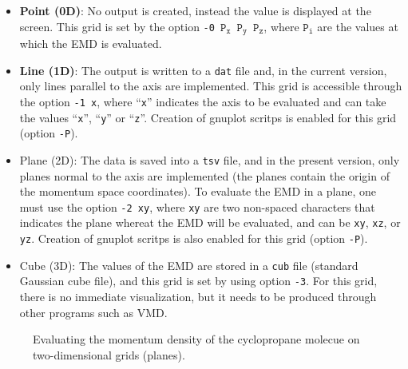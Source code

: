 \begin{itemize}
   \item \textbf{Point (0D)}: No output is created, instead the value is displayed at the screen. This grid is set by the option \texttt{-0 $\mathtt{P}_\mathtt{x}$ $\mathtt{P}_\mathtt{y}$ $\mathtt{P}_\mathtt{z}$}, where \texttt{$\mathtt{P}_\mathtt{i}$} are the values at which the EMD is evaluated.
   \item \textbf{Line (1D)}: The output is written to a \texttt{dat} file and, in the current version, only lines parallel to the axis are implemented. This grid is accessible through the option \texttt{-1 x}, where ``\texttt{x}'' indicates the axis to be evaluated and can take the values ``\texttt{x}'', ``\texttt{y}'' or ``\texttt{z}''. Creation of gnuplot scritps is enabled for this grid (option \texttt{-P}).
   \item{Plane (2D)}: The data is saved into a \texttt{tsv} file, and in the present version, only planes normal to the axis are implemented (the planes contain the origin of the momentum space coordinates). To evaluate the EMD in a plane, one must use the option \texttt{-2 xy}, where \texttt{xy} are two non-spaced characters that indicates the plane whereat the EMD will be evaluated, and can be \texttt{xy}, \texttt{xz}, or \texttt{yz}. Creation of gnuplot scritps is also enabled for this grid (option \texttt{-P}).
   \item{Cube (3D)}: The values of the EMD are stored in a \texttt{cub} file (standard Gaussian cube file), and this grid is set by using option \texttt{-3}. For this grid, there is no immediate visualization, but it needs to be produced through other programs such as VMD.
\end{itemize}
%
\begin{figure}[hb!]
\centering
{}\quad
{}
\caption{Evaluating the momentum density of the cyclopropane molecue on two-dimensional grids (planes).}\label{fig:dtkmomdusex}
\end{figure}
%


